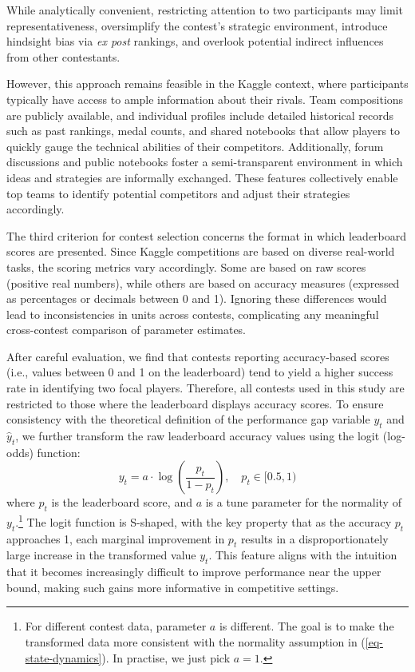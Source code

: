 \documentclass[mnsc]{informs3}
\begin{document}
While analytically convenient, restricting attention to two participants may limit representativeness, oversimplify the contest’s strategic environment, introduce hindsight bias via \textit{ex post} rankings, and overlook potential indirect influences from other contestants.

However, this approach remains feasible in the Kaggle context, where participants typically have access to ample information about their rivals. 
Team compositions are publicly available, and individual profiles include detailed historical records such as past rankings, medal counts, and shared notebooks that allow players to quickly gauge the technical abilities of their competitors. 
Additionally, forum discussions and public notebooks foster a semi-transparent environment in which ideas and strategies are informally exchanged. 
These features collectively enable top teams to identify potential competitors and adjust their strategies accordingly. 

The third criterion for contest selection concerns the format in which leaderboard scores are presented.
Since Kaggle competitions are based on diverse real-world tasks, the scoring metrics vary accordingly.
Some are based on raw scores (positive real numbers), while others are based on accuracy measures (expressed as percentages or decimals between 0 and 1).
Ignoring these differences would lead to inconsistencies in units across contests, complicating any meaningful cross-contest comparison of parameter estimates.

After careful evaluation, we find that contests reporting accuracy-based scores (i.e., values between 0 and 1 on the leaderboard) tend to yield a higher success rate in identifying two focal players.
Therefore, all contests used in this study are restricted to those where the leaderboard displays accuracy scores.
To ensure consistency with the theoretical definition of the performance gap variable $y_t$ and $\hat{y}_t$, we further transform the raw leaderboard accuracy values using the logit (log-odds) function: 
\begin{equation}\label{eq-leaderboard-transform}
y_t = a \cdot \log\left(\frac{p_t}{1-p_t}\right), \quad p_t\in[0.5, 1)
\end{equation}
where $p_t$ is the leaderboard score, and $a$ is a tune parameter for the normality of $y_t$.\footnote{
For different contest data, parameter $a$ is different. 
 The goal is to make the transformed data more consistent with the normality assumption in (\ref{eq-state-dynamics}).
In practise, we just pick $a = 1$. 
}
The logit function is S-shaped, with the key property that as the accuracy $p_t$ approaches 1, each marginal improvement in $p_t$ results in a disproportionately large increase in the transformed value $y_t$. 
This feature aligns with the intuition that it becomes increasingly difficult to improve performance near the upper bound, making such gains more informative in competitive settings.
\end{document}
